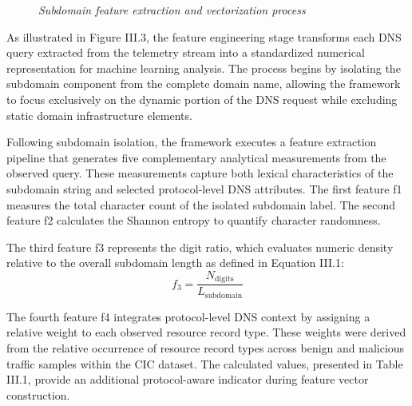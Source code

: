 \documentclass[14pt, a4paper, oneside]{report}
\begin{document}
\begin{figure}[htbp]
\caption{\textit {Subdomain feature extraction and vectorization process}}
\label{fig:subdomain_feature_extraction_pipeline}
\end{figure}

As illustrated in Figure III.3, the feature engineering stage transforms each DNS query extracted from the telemetry stream into a standardized numerical representation for machine learning analysis. The process begins by isolating the subdomain component from the complete domain name, allowing the framework to focus exclusively on the dynamic portion of the DNS request while excluding static domain infrastructure elements.

Following subdomain isolation, the framework executes a feature extraction pipeline that generates five complementary analytical measurements from the observed query. These measurements capture both lexical characteristics of the subdomain string and selected protocol-level DNS attributes. The first feature f1 measures the total character count of the isolated subdomain label. The second feature f2 calculates the Shannon entropy to quantify character randomness.

The third feature f3 represents the digit ratio, which evaluates numeric density relative to the overall subdomain length as defined in Equation III.1:
\begin{equation}
f_3 = \frac{N_{\text{digits}}}{L_{\text{subdomain}}}
\end{equation}

The fourth feature f4 integrates protocol-level DNS context by assigning a relative weight to each observed resource record type. These weights were derived from the relative occurrence of resource record types across benign and malicious traffic samples within the CIC dataset. The calculated values, presented in Table III.1, provide an additional protocol-aware indicator during feature vector construction.
\end{document}
